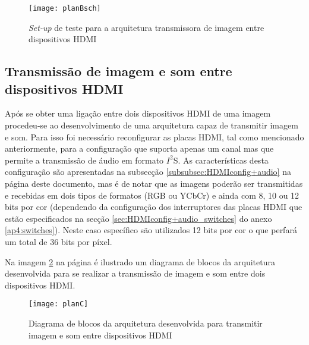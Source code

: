 \begin{figure}[h!]
	\begin{center}
		\leavevmode
		\texttt{[image: planBsch]}
		\caption{\textit{Set-up} de teste para a arquitetura transmissora de imagem entre dispositivos HDMI}
		\label{fig:planb_sch}
	\end{center}
\end{figure}

\subsection{Transmissão de imagem e som entre dispositivos HDMI}

Após se obter uma ligação entre dois dispositivos HDMI de uma imagem procedeu-se ao desenvolvimento de uma arquitetura capaz de transmitir imagem e som. Para isso foi necessário reconfigurar as placas HDMI, tal como mencionado anteriormente, para a configuração que suporta apenas um canal mas que permite a transmissão de áudio em formato $I^{2}$S. As características desta configuração são apresentadas na subsecção \ref{subsubsec:HDMIconfig+audio} na página \pageref{subsubsec:HDMIconfig+audio} deste documento, mas é de notar que as imagens poderão ser transmitidas e recebidas em dois tipos de formatos (RGB ou YCbCr) e ainda com 8, 10 ou 12 bits por cor (dependendo da configuração dos interruptores das placas HDMI que estão especificados na secção \ref{sec:HDMIconfig+audio_switches} do anexo \ref{ap4:switches}). Neste caso específico são utilizados 12 bits por cor o que perfará um total de 36 bits por píxel.

Na imagem \ref{fig:planC} na página \pageref{fig:planC} é ilustrado um diagrama de blocos da arquitetura desenvolvida para se realizar a transmissão de imagem e som entre dois dispositivos HDMI. 

\begin{figure}[h!]
	\begin{center}
		\leavevmode
		\texttt{[image: planC]}
		\caption{Diagrama de blocos da arquitetura desenvolvida para transmitir imagem e som entre dispositivos HDMI}
		\label{fig:planC}
	\end{center}
\end{figure}

